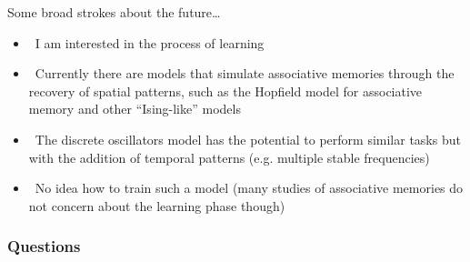 \documentclass[serif,mathserif]{beamer}
\begin{document}
\begin{frame}{Some broad strokes about the future\dots}
    \begin{itemize}
        \item \ \pause I am interested in the process of learning
        \item \ \pause Currently there are models that simulate associative memories through the recovery of spatial patterns, such as the Hopfield model for associative memory and other ``Ising-like'' models
        \item \ \pause The discrete oscillators model has the potential to perform similar tasks but with the addition of temporal patterns (e.g. multiple stable frequencies)
        \item \ \pause No idea how to train such a model (many studies of associative memories do not concern about the learning phase though)
    \end{itemize}
\end{frame}

\begin{frame}
  \frametitle{Questions}
\end{frame}
\end{document}
